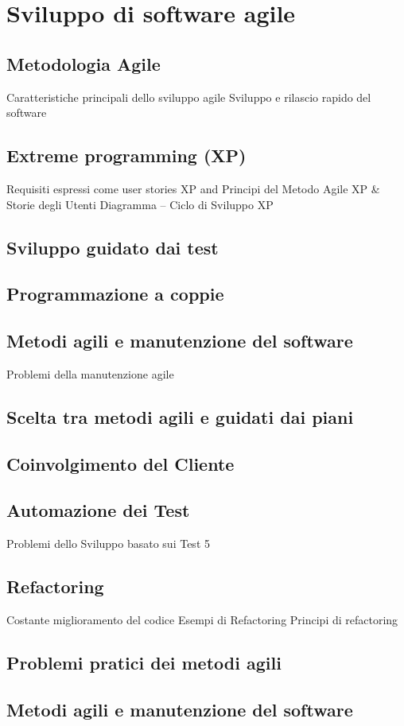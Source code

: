 \documentclass{article}
\begin{document}
	\section{Sviluppo di software agile}
	\subsection{Metodologia Agile}
	Caratteristiche principali dello sviluppo agile
	Sviluppo e rilascio rapido del software
	\subsection{Extreme programming (XP)}
	Requisiti espressi come user stories
	XP and Principi del Metodo Agile
	XP \& Storie degli Utenti
	Diagramma – Ciclo di Sviluppo XP
	\subsection{Sviluppo guidato dai test}
	\subsection{Programmazione a coppie}
	\subsection{Metodi agili e manutenzione del software}
	Problemi della manutenzione agile
	\subsection{Scelta tra metodi agili e guidati dai piani}
	\subsection{Coinvolgimento del Cliente}
	\subsection{Automazione dei Test}
	Problemi dello Sviluppo basato sui Test
	5\subsection{Refactoring}
	Costante miglioramento del codice
	Esempi di Refactoring
	Principi di refactoring
	\subsection{Problemi pratici dei metodi agili}
	\subsection{Metodi agili e manutenzione del software}
\end{document}
